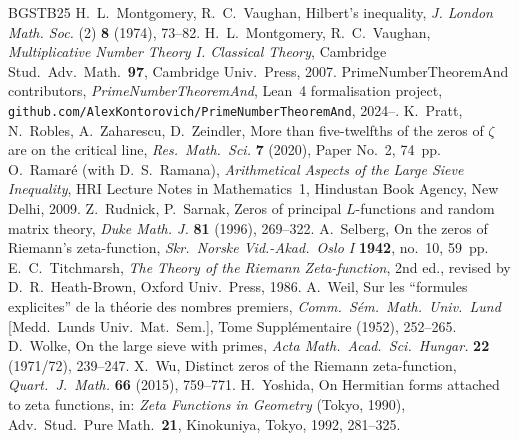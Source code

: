 \documentclass[11pt]{amsart}
\theoremstyle{definition}
\theoremstyle{remark}
\numberwithin{equation}{section}
\begin{document}
\begin{thebibliography}{BGSTB25}
 H.~L.~Montgomery, R.~C.~Vaughan, Hilbert's inequality, \emph{J. London Math. Soc.} (2) \textbf{8} (1974), 73--82.
 H.~L.~Montgomery, R.~C.~Vaughan, \emph{Multiplicative Number Theory I. Classical Theory}, Cambridge Stud.\ Adv.\ Math.\ \textbf{97}, Cambridge Univ.\ Press, 2007.
 PrimeNumberTheoremAnd contributors, \emph{PrimeNumberTheoremAnd}, Lean~4 formalisation project, \texttt{github.com/AlexKontorovich/PrimeNumberTheoremAnd}, 2024--.
 K.~Pratt, N.~Robles, A.~Zaharescu, D.~Zeindler, More than five-twelfths of the zeros of $\zeta$ are on the critical line, \emph{Res.\ Math.\ Sci.} \textbf{7} (2020), Paper No.~2, 74~pp.
 O.~Ramar\'e (with D.~S.~Ramana), \emph{Arithmetical Aspects of the Large Sieve Inequality}, HRI Lecture Notes in Mathematics~1, Hindustan Book Agency, New Delhi, 2009.
 Z.~Rudnick, P.~Sarnak, Zeros of principal $L$-functions and random matrix theory, \emph{Duke Math. J.} \textbf{81} (1996), 269--322.
 A.~Selberg, On the zeros of Riemann's zeta-function, \emph{Skr.\ Norske Vid.-Akad.\ Oslo I} \textbf{1942}, no.~10, 59~pp.
 E.~C.~Titchmarsh, \emph{The Theory of the Riemann Zeta-function}, 2nd ed., revised by D.~R.~Heath-Brown, Oxford Univ.\ Press, 1986.
 A.~Weil, Sur les ``formules explicites'' de la th\'eorie des nombres premiers, \emph{Comm.\ S\'em.\ Math.\ Univ.\ Lund} [Medd.\ Lunds Univ.\ Mat.\ Sem.], Tome Suppl\'ementaire (1952), 252--265.
 D.~Wolke, On the large sieve with primes, \emph{Acta Math.\ Acad.\ Sci.\ Hungar.} \textbf{22} (1971/72), 239--247.
 X.~Wu, Distinct zeros of the Riemann zeta-function, \emph{Quart.\ J.\ Math.} \textbf{66} (2015), 759--771.
 H.~Yoshida, On Hermitian forms attached to zeta functions, in: \emph{Zeta Functions in Geometry} (Tokyo, 1990), Adv.\ Stud.\ Pure Math.\ \textbf{21}, Kinokuniya, Tokyo, 1992, 281--325.
\end{thebibliography}
\end{document}
